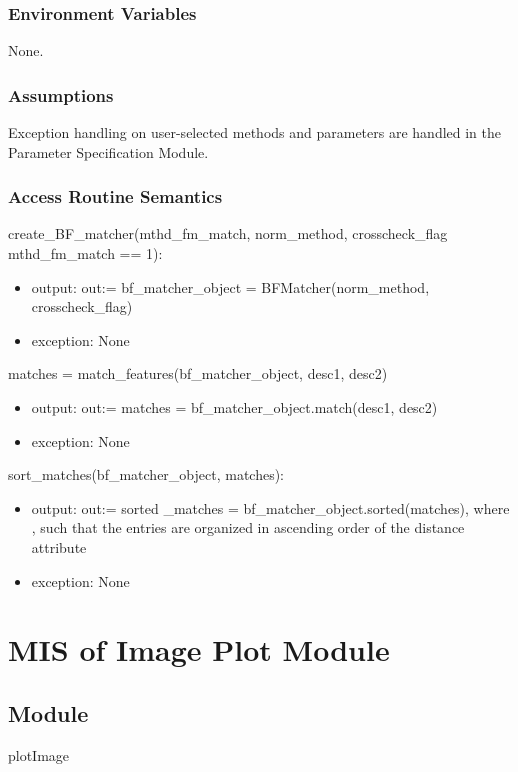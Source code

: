 \documentclass[12pt, titlepage]{article}
\begin{document}
\subsubsection{Environment Variables}

None.

\subsubsection{Assumptions}

Exception handling on user-selected methods and parameters are handled in the Parameter 
Specification Module.

\subsubsection{Access Routine Semantics}
create\_BF\_matcher(mthd\_fm\_match, norm\_method, crosscheck\_flag 
\textbar \: mthd\_fm\_match == 1):
\begin{itemize}
  \item output: out:= bf\_matcher\_object = BFMatcher(norm\_method, 
  crosscheck\_flag) 
  \item exception: None
\end{itemize} 
matches = match\_features(bf\_matcher\_object, desc1, desc2) 
\begin{itemize}
  \item output: out:= matches = bf\_matcher\_object.match(desc1, desc2)
  \item exception: None
\end{itemize}
sort\_matches(bf\_matcher\_object, matches):
\begin{itemize}
  \item output: out:= sorted \_matches = bf\_matcher\_object.sorted(matches), where , such that the entries
  are organized in ascending order of the distance attribute
  \item exception: None
\end{itemize}



\section{MIS of Image Plot Module} \label{mIP}
\subsection{Module}
plotImage
\end{document}
